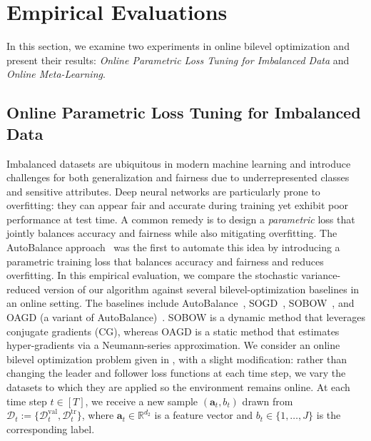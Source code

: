 \documentclass{uai2026} %
\begin{document}
\section{Empirical Evaluations}

\noindent In this section, we examine two experiments in online bilevel optimization and present their results: \emph{Online Parametric Loss Tuning for Imbalanced Data} and \emph{Online Meta-Learning}.

\subsection{Online Parametric Loss Tuning for Imbalanced Data}
\label{sec:exp-parametric-imbalance}

Imbalanced datasets are ubiquitous in modern machine learning and introduce challenges for both generalization and fairness due to underrepresented classes and sensitive attributes. Deep neural networks are particularly prone to overfitting: they can appear fair and accurate during training yet exhibit poor performance at test time. A common remedy is to design a \emph{parametric} loss that jointly balances accuracy and fairness while also mitigating overfitting.
The AutoBalance approach~\citep{li2021autobalance} was the first to automate this idea by introducing a parametric training loss that balances accuracy and fairness and reduces overfitting.
In this empirical evaluation, we compare the stochastic variance-reduced version of our algorithm  against several bilevel-optimization baselines in an online setting. The baselines include AutoBalance~\citep{li2021autobalance}, SOGD~\citep{anonymous2025stochastic}, SOBOW~\citep{lin2023nonconvex}, and OAGD (a variant of AutoBalance)~\citep{tarzanagh2024onlinebileveloptimizationregret}. SOBOW is a dynamic method that leverages conjugate gradients (CG), whereas OAGD is a static method that estimates hyper-gradients via a Neumann-series approximation.
We consider an online bilevel optimization problem given in , with a slight modification: rather than changing the leader and follower loss functions at each time step, we vary the datasets to which they are applied so the environment remains online. At each time step $t\in[T]$, we receive a new sample $(\mathbf{a}_t,b_t)$ drawn from $\mathcal{D}_t:=\{\mathcal{D}_t^{\mathrm{val}},\mathcal{D}_t^{\mathrm{tr}}\}$, where $\mathbf{a}_t\in\mathbb{R}^{d_2}$ is a feature vector and $b_t\in\{1,\ldots,J\}$ is the corresponding label.
\end{document}
